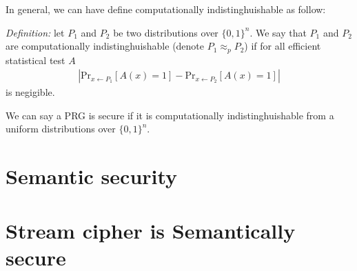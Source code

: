 \documentclass{article}
\begin{document}
In general, we can have define computationally indistinghuishable as follow:

\emph{Definition:} let $P_1$ and $P_2$ be two distributions over $\lbrace 0, 1
\rbrace^n$. We say that $P_1$ and $P_2$ are computationally indistinghuishable
(denote $P_1 \approx_p P_2$) if for all efficient statistical test $A$
\begin{eqnarray}
   \left| \text{Pr}_{x \leftarrow P_1} [A(x) = 1] - \text{Pr}_{x \leftarrow P_2}
     [A(x) = 1] \right|
\end{eqnarray}
is negigible.

We can say a PRG is secure if it is computationally indistinghuishable from a
uniform distributions over $\lbrace 0, 1 \rbrace^n$.

\section{Semantic security}

\section{Stream cipher is Semantically secure}
\end{document}
